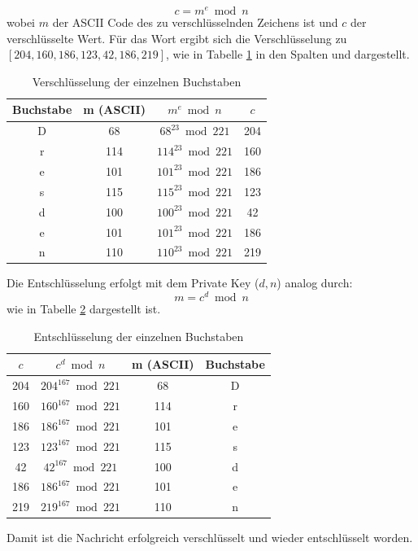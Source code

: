 \[
c = m^e \bmod n
\]
wobei $m$ der ASCII Code des zu verschlüsselnden Zeichens ist und $c$ der verschlüsselte Wert.
Für das Wort  ergibt sich die Verschlüsselung zu $[204, 160, 186, 123, 42, 186, 219]$, wie in Tabelle
\ref{tab:encryption_dresden} in den Spalten   und  dargestellt.
\begin{table}[h]
    \centering
    \begin{tabular}{|c|c|c|c|}
        \hline
        Buchstabe & m (ASCII) & $m^e \bmod n$ & $c$ \\
        \hline
        D & 68 & $68^{23} \bmod 221$ & 204 \\
        r & 114 & $114^{23} \bmod 221$ & 160 \\
        e & 101 & $101^{23} \bmod 221$ & 186 \\
        s & 115 & $115^{23} \bmod 221$ & 123 \\
        d & 100 & $100^{23} \bmod 221$ & 42 \\
        e & 101 & $101^{23} \bmod 221$ & 186 \\
        n & 110 & $110^{23} \bmod 221$ & 219 \\
        \hline
    \end{tabular}
    \caption{Verschlüsselung der einzelnen Buchstaben}
    \label{tab:encryption_dresden}
\end{table}

Die Entschlüsselung erfolgt mit dem Private Key ($d, n$) analog durch:
\[
m = c^d \bmod n
\]
wie in Tabelle \ref{tab:decryption_dresden} dargestellt ist.
\begin{table}[H]
    \centering
    \begin{tabular}{|c|c|c|c|}
        \hline
        $c$ & $c^d \bmod n$ & m (ASCII) & Buchstabe \\
        \hline
        204 & $204^{167} \bmod 221$ & 68 & D \\
        160 & $160^{167} \bmod 221$ & 114 & r \\
        186 & $186^{167} \bmod 221$ & 101 & e \\
        123 & $123^{167} \bmod 221$ & 115 & s \\
        42 & $42^{167} \bmod 221$ & 100 & d \\
        186 & $186^{167} \bmod 221$ & 101 & e \\
        219 & $219^{167} \bmod 221$ & 110 & n \\
        \hline
    \end{tabular}
    \caption{Entschlüsselung der einzelnen Buchstaben}
    \label{tab:decryption_dresden}
\end{table}
Damit ist die Nachricht  erfolgreich verschlüsselt und wieder entschlüsselt worden.



